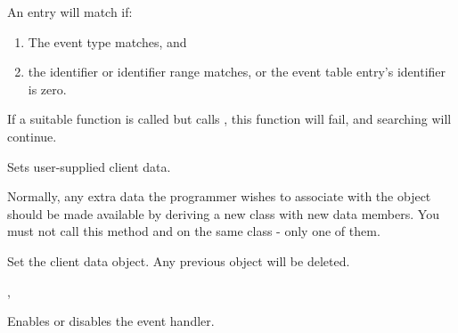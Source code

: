 An entry will match if:

\begin{enumerate}\itemsep=0pt
\item The event type matches, and
\item the identifier or identifier range matches, or the event table entry's identifier is zero.
\end{enumerate}

If a suitable function is called but calls , this function will
fail, and searching will continue.



\label{wxevthandlersetclientdata}


Sets user-supplied client data.




Normally, any extra data the programmer wishes to associate with 
the object should be made available by deriving a new class
with new data members. You must not call this method and
 on the
same class - only one of them.



\label{wxevthandlersetclientobject}


Set the client data object. Any previous object will be deleted.


,

\label{wxevthandlersetevthandlerenabled}


Enables or disables the event handler.

